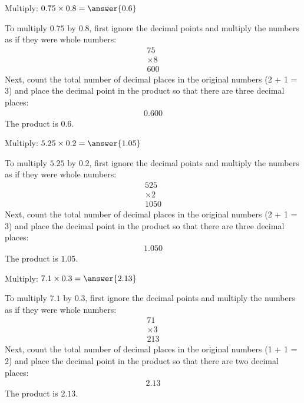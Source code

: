 \documentclass{ximera}
\begin{document}
\begin{problem}
Multiply: $0.75 \times 0.8 = \answer{0.6}$
\begin{feedback}
To multiply $0.75$ by $0.8$, first ignore the decimal points and multiply the numbers as if they were whole numbers:
\begin{align*}
   75 \\
\times   8 \\
\hline
   600
\end{align*}
Next, count the total number of decimal places in the original numbers (2 + 1 = 3) and place the decimal point in the product so that there are three decimal places:
\begin{align*}
   0.600
\end{align*}
The product is $0.6$.
\end{feedback}
\end{problem}

\begin{problem}
Multiply: $5.25 \times 0.2 = \answer{1.05}$
\begin{feedback}
To multiply $5.25$ by $0.2$, first ignore the decimal points and multiply the numbers as if they were whole numbers:
\begin{align*}
   525 \\
\times   2 \\
\hline
   1050
\end{align*}
Next, count the total number of decimal places in the original numbers (2 + 1 = 3) and place the decimal point in the product so that there are three decimal places:
\begin{align*}
   1.050
\end{align*}
The product is $1.05$.
\end{feedback}
\end{problem}

\begin{problem}
Multiply: $7.1 \times 0.3 = \answer{2.13}$
\begin{feedback}
To multiply $7.1$ by $0.3$, first ignore the decimal points and multiply the numbers as if they were whole numbers:
\begin{align*}
   71 \\
\times   3 \\
\hline
   213
\end{align*}
Next, count the total number of decimal places in the original numbers (1 + 1 = 2) and place the decimal point in the product so that there are two decimal places:
\begin{align*}
   2.13
\end{align*}
The product is $2.13$.
\end{feedback}
\end{problem}
\end{document}
